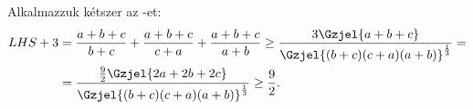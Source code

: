 Alkalmazzuk kétszer az -et:
\begin{align*}
LHS+3 &= \frac{a+b+c}{b+c}+\frac{a+b+c}{c+a}+\frac{a+b+c}{a+b} \ge 
\frac{ 3\Gzjel{a+b+c} }{\Gzjel{(b+c)(c+a)(a+b)}^{\frac{1}{3}}} = \\
&=\frac{ \frac{9}{2}\Gzjel{2a+2b+2c}}{\Gzjel{(b+c)(c+a)(a+b)}^{\frac{1}{3}}} \ge \frac{9}{2}.
\end{align*}
